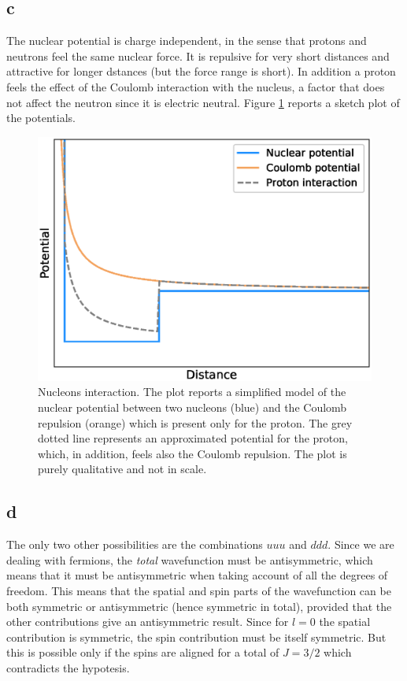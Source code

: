 \subsection*{c}
The nuclear potential is charge independent, in the sense that protons and neutrons feel the same nuclear force. It is repulsive for very short distances and attractive for longer dstances (but the force range is short).
In addition a proton feels the effect of the Coulomb interaction with the nucleus, a factor that does not affect the neutron since it is electric neutral. Figure \ref{fig:nucleons_potentials} reports a sketch plot of the 
potentials.
\begin{figure}[hbtp]
    \centering 
    \includegraphics[scale=0.5]{ex1/nucleons.eps}
    \caption{Nucleons interaction. The plot reports  a simplified model of the nuclear potential between two nucleons (blue) and the Coulomb repulsion (orange) which is present
    only for the proton. The grey dotted line represents an approximated potential for the proton, which, in addition, feels also the Coulomb repulsion. The plot is purely qualitative and not in scale.}
    \label{fig:nucleons_potentials}
\end{figure}

\subsection*{d}
The only two other possibilities are the combinations $uuu$ and $ddd$. Since we are dealing with fermions, the \emph{total} wavefunction must be antisymmetric, which means that 
it must be antisymmetric when taking account of all the degrees of freedom. This means that the spatial and spin parts of the wavefunction can be both symmetric or antisymmetric (hence symmetric in total),
provided that the other contributions give an antisymmetric result. Since for $l=0$ the spatial contribution is symmetric, the spin contribution must be itself symmetric. But this is possible only if 
the spins are aligned for a total of $J=3/2$ which contradicts the hypotesis.

